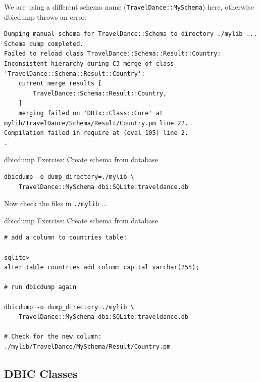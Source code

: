 We are using a different schema name (\verb|TravelDance::MySchema|) here,
otherwise dbicdump throws an error:

\begin{lstlisting}
Dumping manual schema for TravelDance::Schema to directory ./mylib ...
Schema dump completed.
Failed to reload class TravelDance::Schema::Result::Country: Inconsistent hierarchy during C3 merge of class 'TravelDance::Schema::Result::Country':
	current merge results [
		TravelDance::Schema::Result::Country,
	]
	merging failed on 'DBIx::Class::Core' at mylib/TravelDance/Schema/Result/Country.pm line 22.
Compilation failed in require at (eval 105) line 2.
.
\end{lstlisting}

\begin{frame}[fragile]{dbicdump Exercise: Create schema from database}
\begin{lstlisting}
dbicdump -o dump_directory=./mylib \
    TravelDance::MySchema dbi:SQLite:traveldance.db
\end{lstlisting}

Now check the files in \verb|./mylib| ...
\end{frame}

\begin{frame}[fragile]{dbicdump Exercise: Create schema from database}
\begin{lstlisting}
# add a column to countries table:

sqlite> 
alter table countries add column capital varchar(255);

# run dbicdump again

dbicdump -o dump_directory=./mylib \
    TravelDance::MySchema dbi:SQLite:traveldance.db

# Check for the new column:
./mylib/TravelDance/MySchema/Result/Country.pm

\end{lstlisting}
\end{frame}

\subsection{DBIC Classes}

